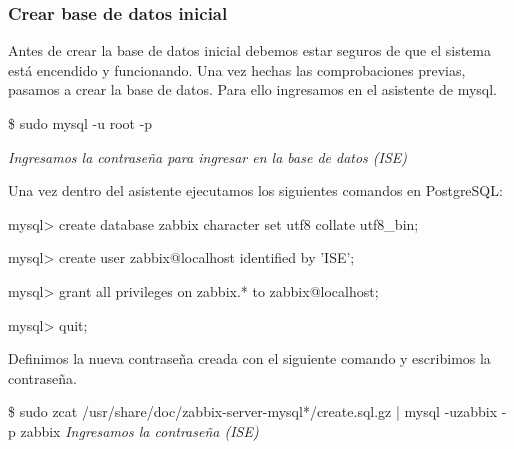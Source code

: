     \subsubsection{Crear base de datos inicial}
    Antes de crear la base de datos inicial debemos estar seguros de que el sistema está encendido y funcionando. Una vez hechas las comprobaciones previas,
    pasamos a crear la base de datos. Para ello ingresamos en el asistente de mysql.
        \begin{tcolorbox}[colback=black!10, halign=left]
            \$ sudo mysql -u root -p

            \emph{Ingresamos la contraseña para ingresar en la base de datos (ISE)}
        \end{tcolorbox}

    Una vez dentro del asistente ejecutamos los siguientes comandos en PostgreSQL:
        \begin{tcolorbox}[colback=black!10, halign=left]
            mysql> create database zabbix character set utf8 collate utf8\_bin;

            mysql> create user zabbix@localhost identified by 'ISE';

            mysql> grant all privileges on zabbix.* to zabbix@localhost;

            mysql> quit;
        \end{tcolorbox}

    Definimos la nueva contraseña creada con el siguiente comando y escribimos la contraseña.
        \begin{tcolorbox}[colback=black!10, halign=left]
            \$ sudo zcat /usr/share/doc/zabbix-server-mysql*/create.sql.gz | mysql -uzabbix -p zabbix
            \emph{Ingresamos la contraseña (ISE)}
        \end{tcolorbox}

